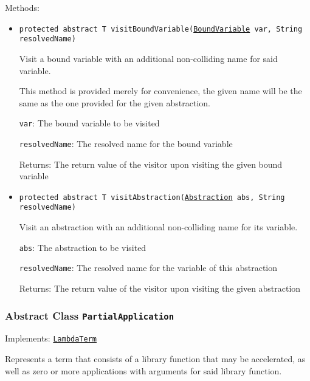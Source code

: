 Methods:
\begin{itemize}
\item \texttt{protected abstract T visitBoundVariable(\hyperref[type:edu.kit.wavelength.client.model.term.BoundVariable]{BoundVariable} var, String resolvedName)}

Visit a bound variable with an additional non-colliding name for
 said variable.
 
 This method is provided merely for convenience, the given name
 will be the same as the one provided for the given abstraction.

\texttt{var}: The bound variable to be visited

\texttt{resolvedName}: The resolved name for the bound variable

Returns: The return value of the visitor upon visiting the given bound variable

\item \texttt{protected abstract T visitAbstraction(\hyperref[type:edu.kit.wavelength.client.model.term.Abstraction]{Abstraction} abs, String resolvedName)}

Visit an abstraction with an additional non-colliding name for
 its variable.

\texttt{abs}: The abstraction to be visited

\texttt{resolvedName}: The resolved name for the variable of this
 abstraction

Returns: The return value of the visitor upon visiting the given abstraction

\end{itemize}

\subsubsection{Abstract Class \texttt{PartialApplication}}
\label{type:edu.kit.wavelength.client.model.term.PartialApplication}
Implements: \texttt{\hyperref[type:edu.kit.wavelength.client.model.term.LambdaTerm]{LambdaTerm}}

Represents a term that consists of a library function that may be accelerated, as well as
 zero or more applications with arguments for said library function.

